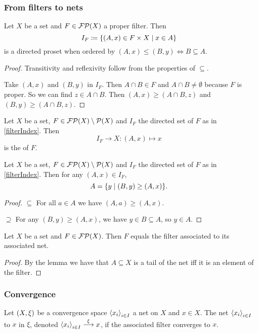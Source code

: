 \subsubsection{From filters to nets}
\begin{lemma} \label{filterIndex}
Let $X$ be a set and $F\in\operatorname{\mathcal{FP}}(X)$ a proper filter. Then
\[ I_F \defeq \setbuilder{(A,x)\in F\times X}{x\in A} \]
is a directed proset when ordered by $(A,x)\leq (B,y) \iff B\subseteq A$.
\end{lemma}
\begin{proof}
Transitivity and reflexivity follow from the properties of $\subseteq$.

Take $(A,x)$ and $(B,y)$ in $I_F$. Then $A\cap B\in F$ and $A\cap B \neq \emptyset$ because $F$ is proper. So we can find $z\in A\cap B$. Then $(A,x) \geq (A\cap B,z)$ and $(B,y) \geq (A\cap B, z)$.
\end{proof}

\begin{definition}
Let $X$ be a set, $F\in\operatorname{\mathcal{FP}}(X)\setminus\operatorname{\mathcal{P}}(X)$ and $I_F$ the directed set of $F$ as in \ref{filterIndex}. Then
\[ I_F \to X: (A,x) \mapsto x \]
is the  of $F$.
\end{definition}

\begin{lemma} \label{tailsFilterIndex}
Let $X$ be a set, $F\in\operatorname{\mathcal{FP}}(X)\setminus\operatorname{\mathcal{P}}(X)$ and $I_F$ the directed set of $F$ as in \ref{filterIndex}. Then for any $(A,x)\in I_F$,
\[ A = \setbuilder{y}{(B,y) \geq (A,x)}. \]
\end{lemma}
\begin{proof}
$\boxed{\subseteq}$ For all $a\in A$ we have $(A,a)\geq (A,x)$.

$\boxed{\supseteq}$ For any $(B,y) \geq (A,x)$, we have $y\in B\subseteq A$, so $y\in A$.
\end{proof}
\begin{corollary}
Let $X$ be a set and $F\in\operatorname{\mathcal{FP}}(X)$. Then $F$ equals the filter associated to its associated net.
\end{corollary}
\begin{proof}
By the lemma we have that $A\subseteq X$ is a tail of the net iff it is an element of the filter.
\end{proof}

\subsubsection{Convergence}
\begin{definition}
Let $\left( X,\xi \right)$ be a convergence space $\left\langle x_i \right\rangle_{i\in I}$ a net on $X$ and $x\in X$. The net $\left\langle x_i \right\rangle_{i\in I}$  to $x$ in $\xi$, denoted $\left\langle x_i \right\rangle_{i\in I} \overset{\xi}{\longrightarrow} x$, if the associated filter converges to $x$.
\end{definition}



